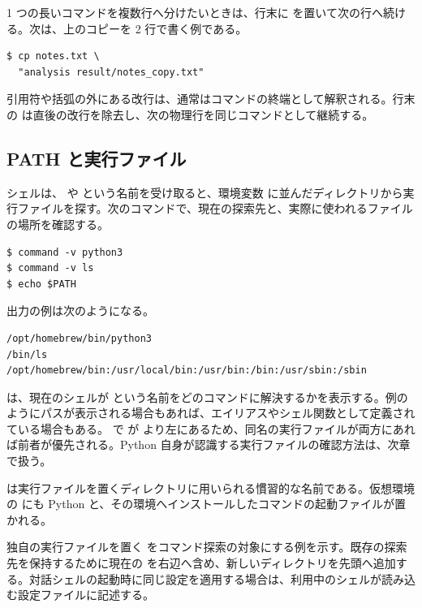 1 つの長いコマンドを複数行へ分けたいときは、行末に \code{\textbackslash} を置いて次の行へ続ける。次は、上のコピーを 2 行で書く例である。

\begin{lstlisting}[numbers=none, xleftmargin=2\zw]
$ cp notes.txt \
  "analysis result/notes_copy.txt"
\end{lstlisting}

引用符や括弧の外にある改行は、通常はコマンドの終端として解釈される。行末の \code{\textbackslash} は直後の改行を除去し、次の物理行を同じコマンドとして継続する。

\subsection{PATH と実行ファイル}

シェルは、 や  という名前を受け取ると、環境変数  に並んだディレクトリから実行ファイルを探す。次のコマンドで、現在の探索先と、実際に使われるファイルの場所を確認する。

\begin{lstlisting}[numbers=none, xleftmargin=2\zw]
$ command -v python3
$ command -v ls
$ echo $PATH
\end{lstlisting}

出力の例は次のようになる。

\begin{lstlisting}[numbers=none, xleftmargin=2\zw]
/opt/homebrew/bin/python3
/bin/ls
/opt/homebrew/bin:/usr/local/bin:/usr/bin:/bin:/usr/sbin:/sbin
\end{lstlisting}

 は、現在のシェルが  という名前をどのコマンドに解決するかを表示する。例のようにパスが表示される場合もあれば、エイリアスやシェル関数として定義されている場合もある。 で  が  より左にあるため、同名の実行ファイルが両方にあれば前者が優先される。Python 自身が認識する実行ファイルの確認方法は、次章で扱う。

 は実行ファイルを置くディレクトリに用いられる慣習的な名前である。仮想環境の  にも Python と、その環境へインストールしたコマンドの起動ファイルが置かれる。

独自の実行ファイルを置く  をコマンド探索の対象にする例を示す。既存の探索先を保持するために現在の  を右辺へ含め、新しいディレクトリを先頭へ追加する。対話シェルの起動時に同じ設定を適用する場合は、利用中のシェルが読み込む設定ファイルに記述する。

